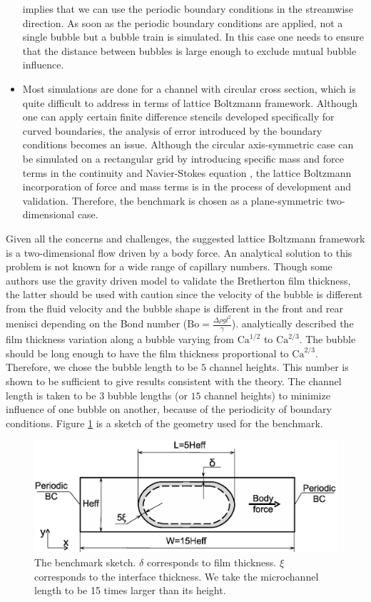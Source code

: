 \documentclass[preprint,12pt]{elsarticle}
\newcommand{\Ca}{\mathrm{Ca}}
\begin{document}
\begin{itemize}
implies that we can use the periodic boundary conditions in the streamwise direction. As soon as the
periodic boundary
conditions are applied, not a single bubble but a bubble train is simulated. In this case one
needs
to ensure that the distance between bubbles is large enough to exclude mutual bubble influence.
 \item Most simulations are done for a channel with circular cross section,
which is quite difficult to address in terms of lattice Boltzmann framework.
Although one can apply certain finite difference stencils
\cite{arnold-boundary,hunt-boundary} developed specifically for curved boundaries,
the analysis of error introduced by the boundary conditions becomes an issue. Although the circular
axis-symmetric case can be simulated on a rectangular grid by introducing specific mass and force
terms in the continuity and Navier-Stokes equation \cite{halliday-circular}, the lattice Boltzmann
incorporation of force and mass terms is in the process of development and validation. Therefore,
the benchmark is chosen as a plane-symmetric two-dimensional case.  
\end{itemize}
Given all the concerns and challenges, the suggested lattice Boltzmann framework
is a two-dimensional flow driven by a body force.  An analytical
solution to this problem is not known for a wide range of capillary
numbers.
Though some authors \cite{sehgal-microchannel} use the gravity driven model to
validate the Bretherton film thickness, the latter should be used with caution
since the velocity of the bubble is different from the fluid velocity and the
bubble shape
is different in the front and rear menisci depending on the Bond number ($\mathrm{Bo}=\frac{\Delta
\rho g
l^2}{\gamma}$). \citet{wong-films}
analytically described the film thickness variation along a bubble varying from $\Ca^{1/2}$ to
$\Ca^{2/3}$. The bubble should be long enough to have the film thickness proportional to
$\Ca^{2/3}$. Therefore, we chose the bubble length to be $5$ channel heights. This number is shown
to be sufficient to give results consistent with the theory. The
channel length is taken to be $3$ bubble lengths (or $15$ channel heights)
to minimize influence of one bubble on another,
because of the periodicity of boundary conditions.
Figure \ref{fig:benchmark:sketch} is a sketch of the geometry
used for the benchmark.
\begin{figure}
\includegraphics[width=\textwidth]{Figures/benchmark_new.eps}
\caption{The benchmark sketch. $\delta$ corresponds to film thickness. $\xi$ corresponds to the interface thickness. We take the microchannel length to be 15 times larger than its height.
\label{fig:benchmark:sketch}}
\end{figure}
\end{document}
